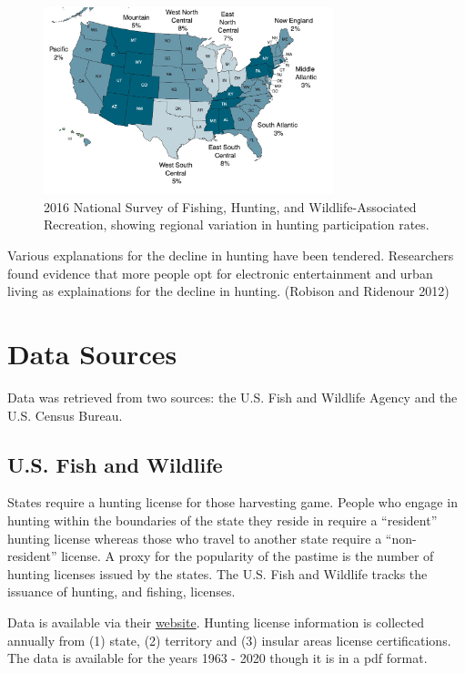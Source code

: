 \documentclass[]{tufte-handout}
\begin{document}
\begin{figure}
\hypertarget{id}{%
\centering
\includegraphics[width=0.75\textwidth,height=0.75\textheight]{./img/2016_fish_wildlife_report.png}
\caption{2016 National Survey of Fishing, Hunting, and
Wildlife-Associated Recreation, showing regional variation in hunting
participation rates.}\label{id}
}
\end{figure}

Various explanations for the decline in hunting have been tendered.
Researchers found evidence that more people opt for electronic
entertainment and urban living as explainations for the decline in
hunting. (Robison and Ridenour 2012)

\hypertarget{data-sources}{%
\section{Data Sources}\label{data-sources}}

Data was retrieved from two sources: the U.S. Fish and Wildlife Agency
and the U.S. Census Bureau.

\hypertarget{u.s.-fish-and-wildlife}{%
\subsection{U.S. Fish and Wildlife}\label{u.s.-fish-and-wildlife}}

States require a hunting license for those harvesting game. People who
engage in hunting within the boundaries of the state they reside in
require a ``resident'' hunting license whereas those who travel to
another state require a ``non-resident'' license. A proxy for the
popularity of the pastime is the number of hunting licenses issued by
the states. The U.S. Fish and Wildlife tracks the issuance of hunting,
and fishing, licenses.

Data is available via their
\href{https://www.fws.gov/wsfrprograms/Subpages/LicenseInfo/Hunting.htm}{website}.
Hunting license information is collected annually from (1) state, (2)
territory and (3) insular areas license certifications. The data is
available for the years 1963 - 2020 though it is in a pdf format.
\end{document}
